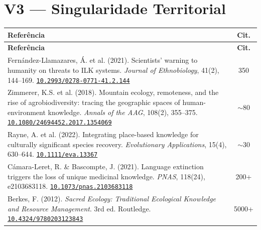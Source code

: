 \documentclass[a4paper,11pt]{article}
\newcommand{\doi}[1]{\href{https://doi.org/#1}{\texttt{#1}}}
\begin{document}
\section{V3 --- Singularidade Territorial}

\begin{longtable}{>{\raggedright\arraybackslash}p{} c}
\toprule
\textbf{Referência} & \textbf{Cit.} \\
\midrule
\endfirsthead
\toprule
\textbf{Referência} & \textbf{Cit.} \\
\midrule
\endhead

Fernández-Llamazares, Á. et al. (2021). Scientists' warning to humanity on threats to ILK systems. \textit{Journal of Ethnobiology}, 41(2), 144--169.\newline
\doi{10.2993/0278-0771-41.2.144} & 350 \\
\addlinespace

Zimmerer, K.S. et al. (2018). Mountain ecology, remoteness, and the rise of agrobiodiversity: tracing the geographic spaces of human-environment knowledge. \textit{Annals of the AAG}, 108(2), 355--375.\newline
\doi{10.1080/24694452.2017.1354069} & $\sim$80 \\
\addlinespace

Rayne, A. et al. (2022). Integrating place-based knowledge for culturally significant species recovery. \textit{Evolutionary Applications}, 15(4), 630--644.\newline
\doi{10.1111/eva.13367} & $\sim$30 \\
\addlinespace

Cámara-Leret, R. \& Bascompte, J. (2021). Language extinction triggers the loss of unique medicinal knowledge. \textit{PNAS}, 118(24), e2103683118.\newline
\doi{10.1073/pnas.2103683118} & 200+ \\
\addlinespace

Berkes, F. (2012). \textit{Sacred Ecology: Traditional Ecological Knowledge and Resource Management}. 3rd ed. Routledge.\newline
\doi{10.4324/9780203123843} & 5000+ \\

\bottomrule
\end{longtable}

\end{document}
